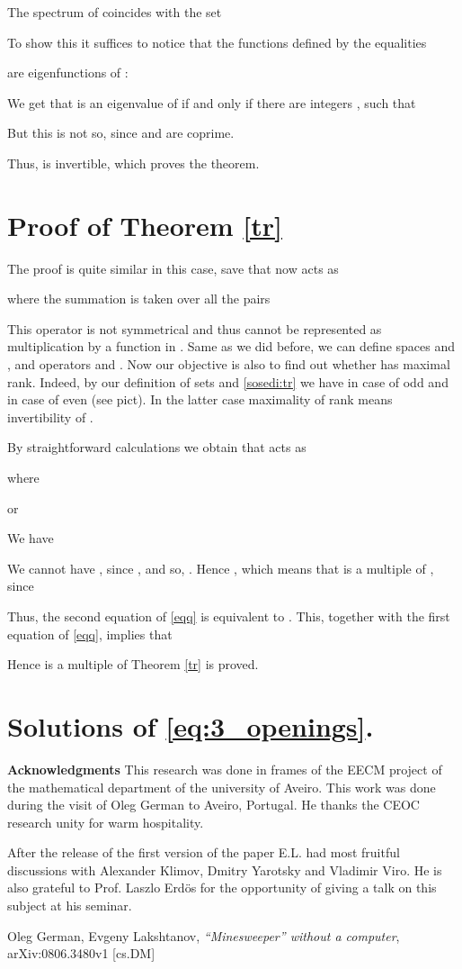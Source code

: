 \documentclass[english,12pt]{article}
\theoremstyle{remark}
\theoremstyle{definition}
\theoremstyle{definition}
\begin{document}
The spectrum of  coincides with the set

To show this it suffices to notice that the functions defined by the equalities

are eigenfunctions of :

We get that  is an eigenvalue of  if and only if there are integers , such that

But this is not so, since  and  are coprime.

Thus,  is invertible, which proves the theorem.


\section{Proof of Theorem \ref{tr}}


The proof is quite similar in this case, save that  now acts as

where the summation is taken over all the pairs

This operator is not symmetrical and thus cannot be represented as multiplication by a function in
. Same as we did before, we can define spaces  and , and operators 
and . Now our objective is also to find out whether  has maximal rank. Indeed, by
our definition of sets  and \eqref{sosedi:tr} we have  in case of odd
 and  in case of even  (see pict). In the latter case maximality of
rank means invertibility of .

By straightforward calculations we obtain that  acts as

where

or

We have

We cannot have , since , and so, . Hence
, which means that  is a multiple of , since

Thus, the second equation of \eqref{eqq} is equivalent to . This, together with the
first equation of \eqref{eqq}, implies that

Hence  is a multiple of  Theorem \ref{tr} is proved.

\section{Solutions of \eqref{eq:3_openings}.}




{\bf Acknowledgments} This research was done in frames of the EECM
 project of the mathematical department of the university of
Aveiro. This work was done during the visit of Oleg German to
Aveiro, Portugal. He thanks the CEOC research unity for warm
hospitality.


After the release of the first version of the paper E.L. had most
fruitful discussions with Alexander Klimov, Dmitry Yarotsky and
Vladimir Viro. He is also grateful to Prof. Laszlo Erd\"os for the
opportunity of giving a talk on this subject at his seminar.
\begin{thebibliography}{99}

 Oleg German, Evgeny Lakshtanov, {\it  ``Minesweeper'' without a computer},
    arXiv:0806.3480v1 [cs.DM]
\end{thebibliography}
\end{document}
